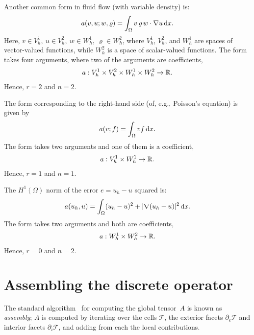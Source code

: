 \begin{example}
\label{example:nonlinearconv}
Another common form in fluid flow (with variable density) is: 
\begin{equation}
a(v,u;w,\varrho) = \int_{\Omega} v \, \varrho \, w \cdot \nabla  u \, \mathrm{d}x. 
\end{equation}
Here, $v\in V_h^1,\ u \in V_h^2,\ w\in W_h^1, \ \varrho \in W_h^2$, where
$V_h^1$, $V_h^2$, and $W_h^1$ are spaces of vector-valued functions, while $W_h^2$ is a space of  
scalar-valued functions. 
The form takes four arguments, where two of the arguments
are coefficients,
\begin{equation}
a : V_h^1 \times V_h^2 \times W_h^1 \times W_h^2 \rightarrow \mathbb{R}.
\end{equation}
Hence, $r=2$ and $n=2$. 
\end{example}

\begin{example}
\label{example:rhs}
The form corresponding to the right-hand side (of, e.g., Poisson's equation)
is given by
\begin{equation}
a(v; f) = \int_{\Omega} v f \, \mathrm{d}x.
\end{equation}
The form takes two arguments and one of them is a coefficient,
\begin{equation}
a : V_h^1 \times  W_h^1 \rightarrow \mathbb{R}.
\end{equation}
Hence, $r = 1$ and $n = 1$.
\end{example}

\begin{example}
The $H^1(\Omega)$ norm of the error $e = u_h - u$ squared is: 
\begin{equation}
a(u_h, u) = \int_{\Omega} (u_h - u)^2 + |\nabla (u_h - u)|^2 \, \mathrm{d}x.
\end{equation}
The form takes two arguments and both are coefficients,
\begin{equation}
a : W_h^1 \times  W_h^2 \rightarrow \mathbb{R}.
\end{equation}
Hence, $r=0$ and $n=2$. 
\end{example}

\section{Assembling the discrete operator}

The standard algorithm~\cite{ZieTay67,Hug87,Lan99} for computing the
global tensor~$A$ is known as \emph{assembly}; $A$ is computed by
iterating over the cells $\mathcal{T}$, the exterior facets
$\partial_e\mathcal{T}$ and interior facets $\partial_i\mathcal{T}$,
and adding from each the local contributions.


